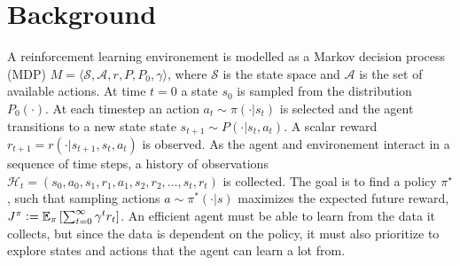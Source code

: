 \documentclass[]{uai2021} %
\title{}
\author[1]{\href{mailto:<jj@example.edu>?Subject=LALAL}{Author}{}}
\newcommand{\defeq}{\vcentcolon=}
\newcommand{\E}{\mathbb{E}}
\newcommand{\state}{\mathcal{S}}
\newcommand{\action}{\mathcal{A}}
\begin{document}
\maketitle

\begin{abstract}
\end{abstract}


\section{Background}
A reinforcement learning environement is modelled as a Markov decision process (MDP)
\(M = \langle \state, \action, r, P, P_0, \gamma \rangle\), where \(\state\) is the
state space and \(\action\) is the set of available actions. At time \(t=0\) a state
\(s_0\) is sampled from the distribution \(P_0(\cdot)\). At each timestep an action
\(a_t \sim \pi(\cdot \vert s_t)\) is selected and the agent transitions to a new state
state \(s_{t+1} \sim P(\cdot \vert s_t, a_t)\). A scalar reward
\(r_{t+1} = r(\cdot \vert s_{t+1}, s_t, a_t)\) is observed. As the agent and environement
interact in a sequence of time steps, a history of observations
\(\mathcal{H}_t = (s_0, a_0, s_1, r_1, a_1, s_2, r_2, \dots, s_t, r_t)\) is collected.
The goal is to find a policy \(\pi^\star\), such that sampling actions
\(a \sim \pi^*(\cdot \vert s)\) maximizes the expected future reward,
\(J^\pi \defeq \E_\pi \left[ \sum_{t=0}^\infty \gamma^t r_t \right]\). An efficient
agent must be able to learn from the data it collects, but since the data is
dependent on the policy, it must also prioritize to explore states and actions that
the agent can learn a lot from.
\end{document}
